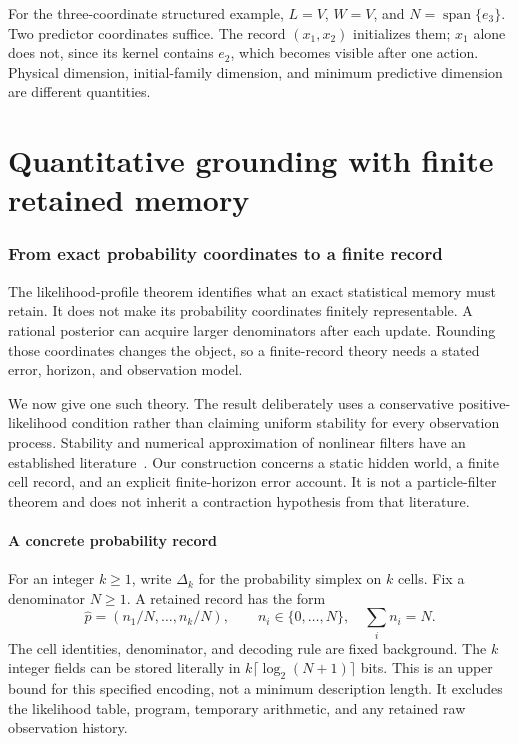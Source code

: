 \documentclass[11pt,letterpaper]{article}
\theoremstyle{plain}
\theoremstyle{definition}
\newcommand{\Span}{\operatorname{span}}\newcommand{\Pow}{\mathcal P}
\begin{document}
For the three-coordinate structured example, $L=V$, $W=V$, and $N=\Span\{e_3\}$. Two predictor coordinates suffice. The record $(x_1,x_2)$ initializes them; $x_1$ alone does not, since its kernel contains $e_2$, which becomes visible after one action. Physical dimension, initial-family dimension, and minimum predictive dimension are different quantities.

\FloatBarrier\clearpage
\part{Quantitative grounding with finite retained memory}
\section{From exact probability coordinates to a finite record}\label{sec:quantized}
The likelihood-profile theorem identifies what an exact statistical memory must retain. It does not make its probability coordinates finitely representable. A rational posterior can acquire larger denominators after each update. Rounding those coordinates changes the object, so a finite-record theory needs a stated error, horizon, and observation model.

We now give one such theory. The result deliberately uses a conservative positive-likelihood condition rather than claiming uniform stability for every observation process. Stability and numerical approximation of nonlinear filters have an established literature~\cite{legland}. Our construction concerns a static hidden world, a finite cell record, and an explicit finite-horizon error account. It is not a particle-filter theorem and does not inherit a contraction hypothesis from that literature.

\subsection{A concrete probability record}
For an integer $k\ge1$, write $\Delta_k$ for the probability simplex on $k$ cells. Fix a denominator $N\ge1$. A retained record has the form
\[
 \widehat p=(n_1/N,\ldots,n_k/N),\qquad n_i\in\{0,\ldots,N\},\quad \sum_i n_i=N.
\]
The cell identities, denominator, and decoding rule are fixed background. The $k$ integer fields can be stored literally in $k\lceil\log_2(N+1)\rceil$ bits. This is an upper bound for this specified encoding, not a minimum description length. It excludes the likelihood table, program, temporary arithmetic, and any retained raw observation history.
\end{document}
